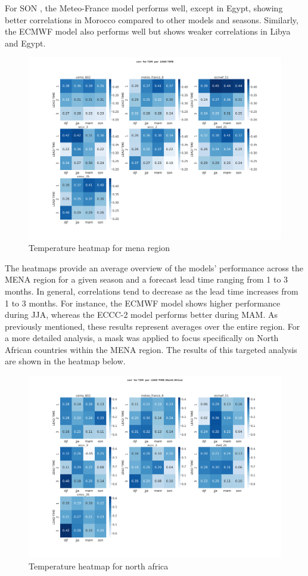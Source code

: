 For SON , the Meteo-France model performs well, except in Egypt, showing better correlations in Morocco compared to other models and seasons. Similarly, the ECMWF model also performs well but shows weaker correlations in Libya and Egypt.
\begin{figure}[H]
    \centering
    \includegraphics[width=1\linewidth]{plots/det/corr/corr_T2M.png}
    \caption{Temperature heatmap for mena region}
   
\end{figure}


The heatmaps provide an average overview of the models' performance across the MENA region for a given season and a forecast lead time ranging from 1 to 3 months. In general, correlations tend to decrease as the lead time increases from 1 to 3 months. For instance, the ECMWF model shows higher performance during JJA, whereas the ECCC-2 model performs better during MAM. As previously mentioned, these results represent averages over the entire region. For a more detailed analysis, a mask was applied to focus specifically on North African countries within the MENA region. The results of this targeted analysis are shown in the heatmap below.
\begin{figure}[H]
    \centering
    \includegraphics[width=1\linewidth]{plots/det/corr/corr_T2M_NorthAfrica.png}
    \caption{Temperature heatmap for north africa}
   
\end{figure}
